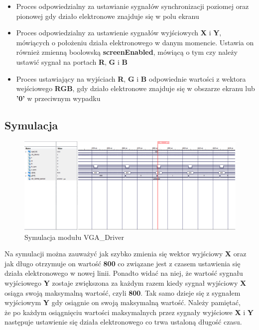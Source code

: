 \documentclass[a4paper]{report}
\begin{document}
			\begin{itemize}
				\item Proces odpowiedzialny za ustawianie sygnałów synchronizacji poziomej oraz pionowej gdy działo elektronowe
				znajduje się w polu ekranu \\
					
				\item Proces odpowiedzialny za ustawienie sygnałów wyjściowych \textbf{X} i \textbf{Y}, mówiących o położeniu działa elektronowego
				w danym momencie. Ustawia on również zmienną boolowską \textbf{screenEnabled}, mówiącą o tym czy
				należy ustawić sygnał na portach \textbf{R}, \textbf{G} i \textbf{B}\\
					
				\item Proces ustawiający na wyjściach \textbf{R}, \textbf{G} i \textbf{B} odpowiednie wartości z wektora wejściowego \textbf{RGB},
				gdy działo elektronowe znajduje się w obszarze ekranu lub \textbf{'0'} w przeciwnym wypadku\\
					
			\end{itemize}			
			
		\begin{landscape}
			\subsection{Symulacja}
				\begin{figure}[h!]
					\centering
					\includegraphics[width=1.6\textwidth]{vga_driver_symulacja2.png}
					\caption{Symulacja modułu VGA\_Driver}
				\end{figure}
			\justify
            Na symulacji można zauważyć jak szybko zmienia się wektor wyjściowy \textbf{X} oraz jak długo otrzymuje on wartość \textbf{800} co związane jest
            z czasem ustawienia się działa elektronowego w nowej linii. Ponadto widać na niej, że wartość sygnału wyjściowego \textbf{Y} zostaje
            zwiększona za każdym razem kiedy sygnał wyjściowy \textbf{X} osiąga swoją maksymalną wartość, czyli \textbf{800}. Tak samo dzieje się z
            sygnałem wyjściowym \textbf{Y} gdy osiągnie on swoją maksymalną wartość. Należy pamiętać, \\że po każdym osiągnięciu wartości maksymalnych
            przez sygnały wyjściowe \textbf{X} i \textbf{Y} następuje ustawienie się działa elektronowego co trwa ustaloną długość czasu.
		\end{landscape}
		
\end{document}
